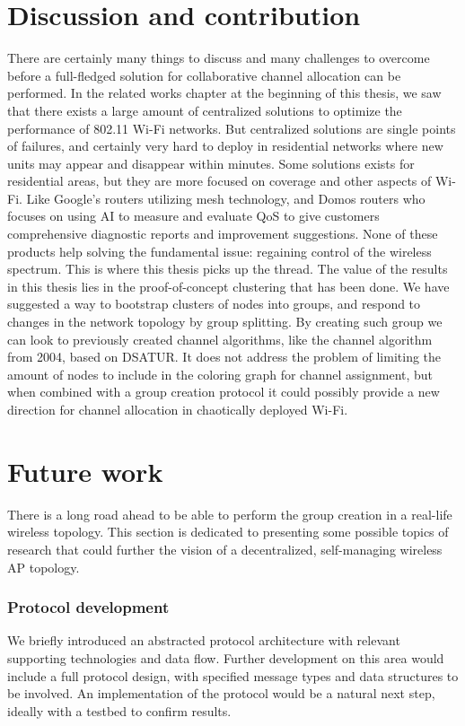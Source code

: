 \section{Discussion and contribution}
There are certainly many things to discuss and many challenges to overcome before a full-fledged solution for collaborative channel allocation can be performed.
In the related works chapter at the beginning of this thesis, we saw that there exists a large amount of centralized solutions
to optimize the performance of 802.11 Wi-Fi networks. But centralized solutions are single points of failures, and certainly very hard to deploy in residential networks where new
units may appear and disappear within minutes. Some solutions exists for residential areas, but they are more focused on coverage and other aspects of Wi-Fi. Like 
Google's routers utilizing mesh technology, and Domos routers who focuses on using AI to measure and evaluate QoS to give customers comprehensive diagnostic reports and improvement suggestions. 
None of these products help solving the fundamental issue: regaining control of the wireless spectrum. This is where this thesis picks up the thread. The value of the results in this
thesis lies in the proof-of-concept clustering that has been done. We have suggested a way to bootstrap clusters of nodes into groups, and respond to changes in the network topology
by group splitting. By creating such group we can look to previously created channel algorithms, like the channel algorithm from 2004, based on DSATUR. It does not address the
problem of limiting the amount of nodes to include in the coloring graph for channel assignment, but when combined with a group creation protocol it could possibly provide a new direction for
channel allocation in chaotically deployed Wi-Fi.  

\section{Future work}
There is a long road ahead to be able to perform the group creation in a real-life wireless topology. This section is dedicated to presenting some possible topics of research
that could further the vision of a decentralized, self-managing wireless AP topology. 

\subsubsection{Protocol development}
We briefly introduced an abstracted protocol architecture with relevant supporting technologies and data flow. Further development on this area would include a full protocol design, with
specified message types and data structures to be involved. An implementation of the protocol would be a natural next step, ideally with a testbed to confirm results. 

